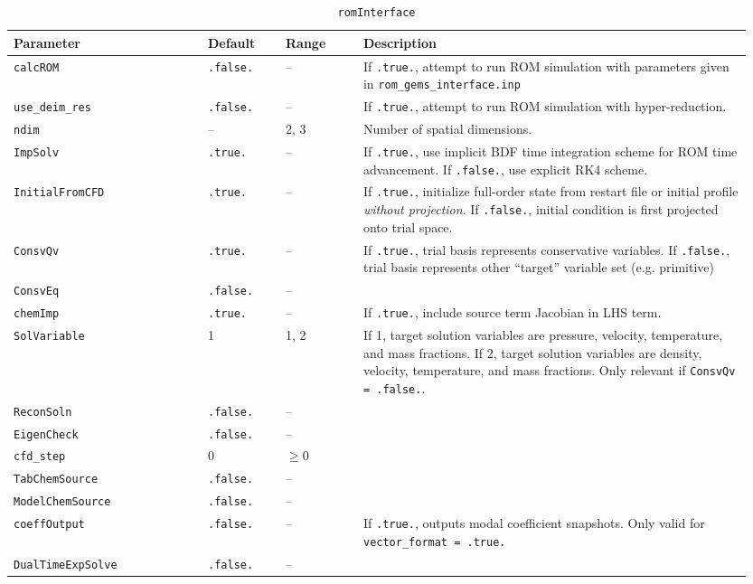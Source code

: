 \begin{table}[H]
    \centering
    \begin{tabular}{p{0.25\linewidth} p{0.1\linewidth} p{0.1\linewidth} p{0.5\linewidth}}
        \toprule
        Parameter & Default & Range & Description \\
        \midrule
        \verb|calcROM| & \verb|.false.| & -- & If \verb|.true.|, attempt to run ROM simulation with parameters given in \verb|rom_gems_interface.inp| \\
        \verb|use_deim_res| & \verb|.false.| & -- & If \verb|.true.|, attempt to run ROM simulation with hyper-reduction. \\
        \verb|ndim| & -- & 2, 3 & Number of spatial dimensions. \\
        \verb|ImpSolv| & \verb|.true.| & -- & If \verb|.true.|, use implicit BDF time integration scheme for ROM time advancement. If \verb|.false.|, use explicit RK4 scheme. \\
        \verb|InitialFromCFD| & \verb|.true.| & -- & If \verb|.true.|, initialize full-order state from restart file or initial profile \textit{without projection}. If \verb|.false.|, initial condition is first projected onto trial space.  \\
        \verb|ConsvQv| & \verb|.true.| & -- & If \verb|.true.|, trial basis represents conservative variables. If \verb|.false.|, trial basis represents other ``target'' variable set (e.g. primitive) \\
        \verb|ConsvEq| & \verb|.false.| & -- & \color{red}{Mystery} \\
        \verb|chemImp| & \verb|.true.| & -- & If \verb|.true.|, include source term Jacobian in LHS term. \\
        \verb|SolVariable| & 1 & 1, 2 & If 1, target solution variables are pressure, velocity, temperature, and mass fractions. If 2, target solution variables are density, velocity, temperature, and mass fractions. Only relevant if \verb|ConsvQv = .false.|. \\
        \verb|ReconSoln|  & \verb|.false.| & -- &  \\
        \verb|EigenCheck| & \verb|.false.| & -- &  \\
        \verb|cfd_step| & 0 & $\ge 0$ &  \\
        \verb|TabChemSource| & \verb|.false.| & -- &  \\
        \verb|ModelChemSource| & \verb|.false.| & -- &  \\
        \verb|coeffOutput| & \verb|.false.| & -- & If \verb|.true.|, outputs modal coefficient snapshots. Only valid for \verb|vector_format = .true.| \\
        \verb|DualTimeExpSolve| & \verb|.false.| & -- &  \\
        \bottomrule 
    \end{tabular}
    \caption{\texttt{romInterface}}
\end{table}

